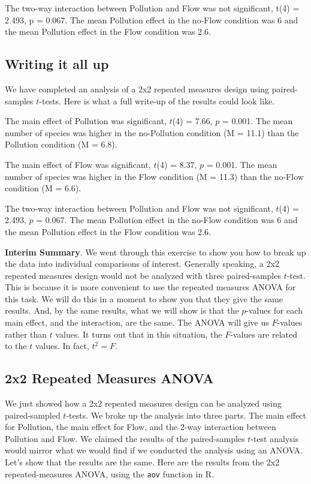 \documentclass[
  letterpaper,
  DIV=11,
  numbers=noendperiod]{scrreprt}
\begin{document}
The two-way interaction between Pollution and Flow was not significant,
t(4) = 2.493, p = 0.067. The mean Pollution effect in the no-Flow
condition was 6 and the mean Pollution effect in the Flow condition was
2.6.

\subsection{Writing it all up}\label{writing-it-all-up}

We have completed an analysis of a 2x2 repeated measures design using
paired-samples \(t\)-tests. Here is what a full write-up of the results
could look like.

The main effect of Pollution was significant, \(t\)(4) = 7.66, \(p\) =
0.001. The mean number of species was higher in the no-Pollution
condition (M = 11.1) than the Pollution condition (M = 6.8).

The main effect of Flow was significant, \(t\)(4) = 8.37, \(p\) = 0.001.
The mean number of species was higher in the Flow condition (M = 11.3)
than the no-Flow condition (M = 6.6).

The two-way interaction between Pollution and Flow was not significant,
\(t\)(4) = 2.493, \(p\) = 0.067. The mean Pollution effect in the
no-Flow condition was 6 and the mean Pollution effect in the Flow
condition was 2.6.

\textbf{Interim Summary}. We went through this exercise to show you how
to break up the data into individual comparisons of interest. Generally
speaking, a 2x2 repeated measures design would not be analyzed with
three paired-samples \(t\)-test. This is because it is more convenient
to use the repeated measures ANOVA for this task. We will do this in a
moment to show you that they give the same results. And, by the same
results, what we will show is that the \(p\)-values for each main
effect, and the interaction, are the same. The ANOVA will give us
\(F\)-values rather than \(t\) values. It turns out that in this
situation, the \(F\)-values are related to the \(t\) values. In fact,
\(t^2 = F\).

\subsection{2x2 Repeated Measures
ANOVA}\label{x2-repeated-measures-anova}

We just showed how a 2x2 repeated measures design can be analyzed using
paired-sampled \(t\)-tests. We broke up the analysis into three parts.
The main effect for Pollution, the main effect for Flow, and the 2-way
interaction between Pollution and Flow. We claimed the results of the
paired-samples \(t\)-test analysis would mirror what we would find if we
conducted the analysis using an ANOVA. Let's show that the results are
the same. Here are the results from the 2x2 repeated-measures ANOVA,
using the \texttt{aov} function in R.
\end{document}
